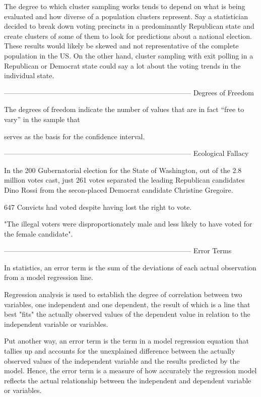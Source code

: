  

The degree to which cluster sampling works tends to depend on what is being evaluated and how diverse of a population clusters represent. Say a statistician decided to break down voting precincts in a predominantly Republican state and create clusters of some of them to look for predictions about a national election. These results would likely be skewed and not representative of the complete population in the US. On the other hand, cluster sampling with exit polling in a Republican or Democrat state could say a lot about the voting trends in the individual state.


--------------------------------------------------------------------------------
Degrees of Freedom

The degrees of freedom indicate the number of values that are in fact “free to vary” in the sample that

serves as the basis for the confidence interval.






--------------------------------------------------------------------------------
Ecological Fallacy

In the 200 Gubernatorial election for the State of Washington, out of the 2.8 million votes cast, just 261 votes separated the leading Republican candidates Dino Rossi from the secon-placed Democrat candidate Christine Gregoire.

647 Convicts had voted despite having lost the right to vote.

 

"The illegal voters were disproportionately male and less likely to have voted for the female candidate".



--------------------------------------------------------------------------------
Error Terms

In statistics, an error term is the sum of the deviations of each actual observation from a model regression line. 


Regression analysis is used to establish the degree of correlation between two variables, one independent and one dependent, the result of which is a line that best "fits" the actually observed values of the dependent value in relation to the independent variable or variables. 


Put another way, an error term is the term in a model regression equation that tallies up and accounts for the unexplained difference between the actually observed values of the independent variable and the results predicted by the model. Hence, the error term is a measure of how accurately the regression model reflects the actual relationship between the independent and dependent variable or variables. 


